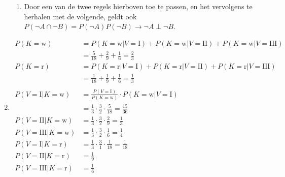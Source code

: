 \documentclass{article}
\begin{document}
\begin{enumerate}
\begin{enumerate}
            \item
                Door een van de twee regels hierboven toe te passen, en het
                vervolgens te herhalen met de volgende, geldt ook $P(\lnot A
                \cap \lnot B) = P(\lnot A) P(\lnot B) \to \lnot A \perp \lnot
                B$.

        \end{enumerate}

    \item
        \newcommand{\kw}{\mathrm{w}}
        \newcommand{\kr}{\mathrm{r}}
        \newcommand{\I}{\mathrm{I}}
        \newcommand{\II}{\mathrm{II}}
        \newcommand{\III}{\mathrm{III}}

        \begin{align*}
            P(K = \kw) &= P(K = \kw | V = \I) + P(K = \kw | V = \II) +
            P(K = \kw | V = \III) \\
            &= \frac5{18} + \frac29 + \frac16 = \frac23 \\
            P(K = \kr) &= P(K = \kr | V = \I) + P(K = \kr | V = \II) +
            P(K = \kr | V = \III) \\
            &= \frac1{18} + \frac19 + \frac16 = \frac13 \\ \\
            P(V = \I | K = \kw) &= \frac{P(V = \I)}{P(K = \kw)} \cdot
            P(K = \kw | V = \I) \\
            &= \frac13 \cdot \frac32 \cdot \frac5{18} = \frac{15}{36} \\
            P(V = \II | K = \kw) &= \frac13 \cdot \frac32 \cdot \frac29
            = \frac13 \\
            P(V = \III | K = \kw) &= \frac13 \cdot \frac32 \cdot \frac16
            = \frac14 \\
            P(V = \I | K = \kr) &= \frac13 \cdot \frac31 \cdot \frac1{18} =
            \frac1{18} \\
            P(V = \II | K = \kr) &= \frac19 \\
            P(V = \III | K = \kr) &= \frac16 \\
        \end{align*}

\end{enumerate}
\end{document}
